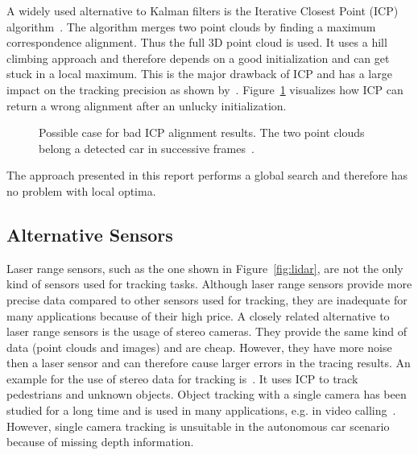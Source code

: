 \documentclass[twoside,a4paper,article]{combine}
\begin{document}
A widely used alternative to Kalman filters is the Iterative Closest
Point (ICP) algorithm~\cite{icp, icp2,
  leibe-tracking-before-detection}.
The algorithm merges
two point clouds by finding a maximum correspondence
alignment. Thus the full 3D point cloud is used. It
uses a hill climbing approach and therefore depends on a good
initialization and can get stuck in a local maximum. This is the major
drawback of ICP and has a large impact on the tracking precision as
shown by~\cite{icp-bad, icp-bad2}. Figure~\ref{fig:icp} visualizes how
ICP can return a wrong alignment after an unlucky initialization.
\begin{figure}
  \center
  
  \caption{Possible case for bad ICP alignment results. The two point
    clouds belong a detected car in successive frames~\cite{held-website}.}
  \label{fig:icp}
\end{figure}
The approach presented in this report performs a global search and
therefore has no problem with local optima.

\subsection{Alternative Sensors}
\label{sub:slternative-sensors}
Laser range sensors, such as the one shown in Figure~\ref{fig:lidar},
are not the only kind of sensors used for tracking tasks. Although
laser range sensors provide more precise data compared to other
sensors used for tracking, they are inadequate
for many applications because of their high price. A closely related
alternative to laser range sensors is the usage of stereo
cameras. They provide the same kind of data (point clouds and images)
and are cheap. However, they have more noise then a laser sensor and
can therefore cause larger errors in the tracing results. An example
for the use of stereo data for tracking
is~\cite{leibe-tracking-before-detection}. It uses ICP to track
pedestrians and unknown objects. Object tracking with a single camera
has been studied for a long time and is used in many applications,
e.g. in video calling~\cite{single-camera-tracking}. However, single
camera tracking is unsuitable in the autonomous car scenario because
of missing depth information.
\end{document}

